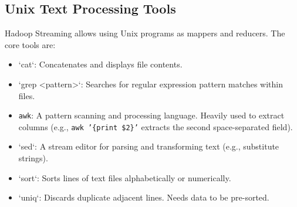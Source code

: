 \documentclass[12pt,a4paper]{article}
\begin{document}
\begin{tcolorbox}[tikzbox, title={Pipeline Data Flow}]
\centering
{}
\end{tcolorbox}

\subsection{Unix Text Processing Tools}
Hadoop Streaming allows using Unix programs as mappers and reducers. The core tools are:
\begin{itemize}[leftmargin=*, itemsep=3pt]
  \item `cat`: Concatenates and displays file contents.
  \item `grep <pattern>`: Searches for regular expression pattern matches within files.
  \item \texttt{awk}: A pattern scanning and processing language. Heavily used to extract columns (e.g., \texttt{awk '\{print \$2\}'} extracts the second space-separated field).
  \item `sed`: A stream editor for parsing and transforming text (e.g., substitute strings).
  \item `sort`: Sorts lines of text files alphabetically or numerically.
  \item `uniq`: Discards duplicate adjacent lines. Needs data to be pre-sorted.
\end{itemize}
\end{document}
